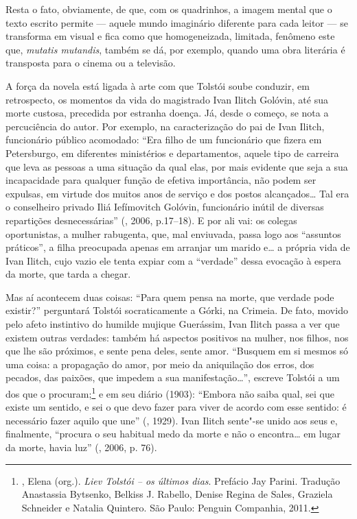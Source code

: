 Resta o fato, obviamente, de que, com os quadrinhos, a imagem
mental que o texto escrito permite --- aquele mundo imaginário
diferente para cada leitor --- se transforma em visual e fica
como que homogeneizada, limitada, fenômeno este que, \emph{mutatis
mutandis}, também se dá, por exemplo, quando uma obra literária é
transposta para o cinema ou a televisão.

A força da novela está ligada à arte com que
Tolstói soube conduzir, em retrospecto, os momentos da vida do
magistrado Ivan Ilitch Golóvin, até sua morte custosa, precedida
por estranha doença. Já, desde o começo, se nota a percuciência
do autor. Por exemplo, na caracterização do pai de Ivan Ilitch,
funcionário público acomodado: ``Era filho de um funcionário que
fizera em Petersburgo, em
diferentes ministérios e departamentos, aquele tipo de
carreira que leva as pessoas a uma situação da qual elas,
por mais evidente que seja a sua incapacidade para qualquer
função de efetiva importância, não podem ser expulsas, em
virtude dos muitos anos de serviço e dos postos alcançados\ldots{}
Tal era o conselheiro privado Iliá Iefímovitch Golóvin,
funcionário inútil de diversas repartições  desnecessárias''
(, 2006, p.17--18). E por ali vai: os colegas
oportunistas, a mulher rabugenta, que, mal enviuvada, passa
logo aos ``assuntos práticos'', a filha preocupada apenas em
arranjar um marido e\ldots{} a própria vida de Ivan Ilitch,
cujo vazio ele tenta expiar com a ``verdade'' dessa evocação
à espera da morte, que tarda a chegar. 

Mas aí acontecem duas coisas: ``Para quem pensa na morte, que
verdade pode existir?'' perguntará Tolstói socraticamente a
Górki, na Crimeia. De fato, movido pelo afeto instintivo do
humilde mujique Guerássim, Ivan Ilitch passa a ver que
existem outras verdades: também há aspectos positivos na
mulher, nos filhos, nos que lhe são próximos, e sente pena
deles, sente amor. ``Busquem em si mesmos só uma coisa: a
propagação do amor, por meio da aniquilação dos erros, dos
pecados, das paixões, que impedem a sua manifestação\ldots{}'',
escreve Tolstói a um dos que o
procuram;\footnote{, Elena (org.). \emph{Liev
Tolstói -- os últimos dias}. Prefácio Jay Parini. Tradução
Anastassia Bytsenko, Belkiss J. Rabello, Denise Regina de
Sales, Graziela Schneider e Natalia Quintero. São Paulo:
Penguin Companhia, 2011.} e em seu diário (1903): ``Embora não saiba qual, sei que existe um sentido, e sei o que
devo fazer para viver de acordo com esse sentido: é necessário
fazer aquilo que une'' (, 1929). Ivan Ilitch
sente"-se unido aos seus e, finalmente, ``procura o seu habitual
medo da morte e não o encontra\ldots{} em lugar da morte, havia
luz'' (, 2006, p. 76).

